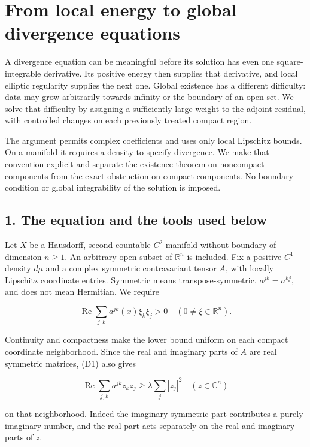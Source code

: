 \documentclass[
  11pt,
]{article}
\author{}
\date{}
\begin{document}
\section{From local energy to global divergence
equations}\label{from-local-energy-to-global-divergence-equations}

A divergence equation can be meaningful before its solution has even one
square-integrable derivative. Its positive energy then supplies that
derivative, and local elliptic regularity supplies the next one. Global
existence has a different difficulty: data may grow arbitrarily towards
infinity or the boundary of an open set. We solve that difficulty by
assigning a sufficiently large weight to the adjoint residual, with
controlled changes on each previously treated compact region.

The argument permits complex coefficients and uses only local Lipschitz
bounds. On a manifold it requires a density to specify divergence. We
make that convention explicit and separate the existence theorem on
noncompact components from the exact obstruction on compact components.
No boundary condition or global integrability of the solution is
imposed.

\subsection{1. The equation and the tools used
below}\label{the-equation-and-the-tools-used-below}

Let \(X\) be a Hausdorff, second-countable \(C^2\) manifold without
boundary of dimension \(n\geq1\). An arbitrary open subset of
\(\mathbb R^n\) is included. Fix a positive \(C^1\) density \(d\mu\) and
a complex symmetric contravariant tensor \(A\), with locally Lipschitz
coordinate entries. Symmetric means transpose-symmetric,
\(a^{jk}=a^{kj}\), and does not mean Hermitian. We require

\[
 \operatorname{Re}\sum_{j,k}a^{jk}(x)\xi_k\xi_j>0
 \quad(0\ne\xi\in\mathbb R^n).                                  \tag{D1}
\]

Continuity and compactness make the lower bound uniform on each compact
coordinate neighborhood. Since the real and imaginary parts of \(A\) are
real symmetric matrices, (D1) also gives

\[
 \operatorname{Re}\sum_{j,k}a^{jk}z_k\overline{z_j}
       \geq \lambda\sum_j|z_j|^2\quad(z\in\mathbb C^n)            \tag{D2}
\]

on that neighborhood. Indeed the imaginary symmetric part contributes a
purely imaginary number, and the real part acts separately on the real
and imaginary parts of \(z\).
\end{document}
